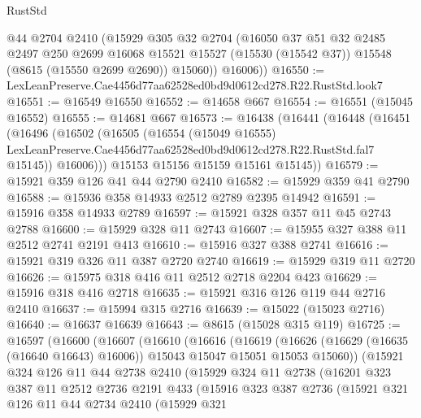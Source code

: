 \begin{lexlean}{RustStd}
\begin{coremodule}
        @44
        @2704
        @2410
        (@15929
          @305
          @32
          @2704
          (@16050
            @37
            @51
            @32
            @2485
            @2497
            @250
            @2699
            @16068
            @15521
            @15527
            (@15530 (@15542 @37))
            @15548
            (@8615 (@15550 @2699 @2690))
            @15060))
        @16006))
@16550 := LexLeanPreserve.Cae4456d77aa62528ed0bd9d0612cd278.R22.RustStd.look7
@16551 := @16549 @16550
@16552 := @14658 @667
@16554 := @16551 (@15045 @16552)
@16555 := @14681 @667
@16573 := @16438
    (@16441
      (@16448
        (@16451
          (@16496
            (@16502
              (@16505
                (@16554
                  (@15049 @16555)
                  LexLeanPreserve.Cae4456d77aa62528ed0bd9d0612cd278.R22.RustStd.fal7
                  @15145))
              @16006)))
        @15153
        @15156
        @15159
        @15161
        @15145))
@16579 := @15921 @359 @126 @41 @44 @2790 @2410
@16582 := @15929 @359 @41 @2790
@16588 := @15936 @358 @14933 @2512 @2789 @2395 @14942
@16591 := @15916 @358 @14933 @2789
@16597 := @15921 @328 @357 @11 @45 @2743 @2788
@16600 := @15929 @328 @11 @2743
@16607 := @15955 @327 @388 @11 @2512 @2741 @2191 @413
@16610 := @15916 @327 @388 @2741
@16616 := @15921 @319 @326 @11 @387 @2720 @2740
@16619 := @15929 @319 @11 @2720
@16626 := @15975 @318 @416 @11 @2512 @2718 @2204 @423
@16629 := @15916 @318 @416 @2718
@16635 := @15921 @316 @126 @119 @44 @2716 @2410
@16637 := @15994 @315 @2716
@16639 := @15022 (@15023 @2716)
@16640 := @16637 @16639
@16643 := @8615 (@15028 @315 @119)
@16725 := @16597
    (@16600
      (@16607
        (@16610
          (@16616
            (@16619
              (@16626 (@16629 (@16635 (@16640 @16643) @16006)) @15043 @15047 @15051 @15053 @15060))
            (@15921
              @324
              @126
              @11
              @44
              @2738
              @2410
              (@15929
                @324
                @11
                @2738
                (@16201
                  @323
                  @387
                  @11
                  @2512
                  @2736
                  @2191
                  @433
                  (@15916
                    @323
                    @387
                    @2736
                    (@15921
                      @321
                      @126
                      @11
                      @44
                      @2734
                      @2410
                      (@15929
                        @321

\end{coremodule}
\end{lexlean}
